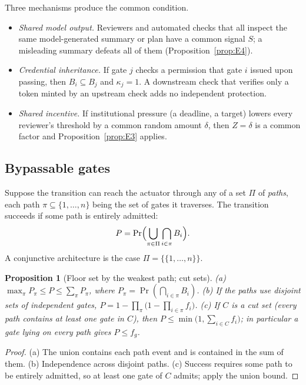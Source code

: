 \documentclass[11pt]{article}
\newtheorem{proposition}[theorem]{Proposition}
\theoremstyle{definition}
\begin{document}
Three mechanisms produce the common condition.

\begin{itemize}[leftmargin=1.6em,itemsep=0.1em]
\item \emph{Shared model output.} Reviewers and automated checks that all inspect the same model-generated summary or plan have a common signal $S$; a misleading summary defeats all of them (Proposition~\ref{prop:E4}).
\item \emph{Credential inheritance.} If gate $j$ checks a permission that gate $i$ issued upon passing, then $B_i\subseteq B_j$ and $\kappa_j=1$. A downstream check that verifies only a token minted by an upstream check adds no independent protection.
\item \emph{Shared incentive.} If institutional pressure (a deadline, a target) lowers every reviewer's threshold by a common random amount $\delta$, then $Z=\delta$ is a common factor and Proposition~\ref{prop:E3} applies.
\end{itemize}

\subsection{Bypassable gates}

Suppose the transition can reach the actuator through any of a set $\Pi$ of \emph{paths}, each path $\pi\subseteq\{1,\dots,n\}$ being the set of gates it traverses. The transition succeeds if some path is entirely admitted:
\[
P=\Pr\Bigl(\bigcup_{\pi\in\Pi}\bigcap_{i\in\pi}B_i\Bigr).
\]
A conjunctive architecture is the case $\Pi=\{\{1,\dots,n\}\}$.

\begin{proposition}[Floor set by the weakest path; cut sets]\label{prop:E5}
(a) $\max_{\pi}P_\pi\le P\le\sum_\pi P_\pi$, where $P_\pi=\Pr(\bigcap_{i\in\pi}B_i)$. (b) If the paths use disjoint sets of independent gates, $P=1-\prod_\pi\bigl(1-\prod_{i\in\pi}f_i\bigr)$. (c) If $C$ is a \emph{cut set} (every path contains at least one gate in $C$), then $P\le\min\bigl(1,\sum_{i\in C}f_i\bigr)$; in particular a gate lying on every path gives $P\le f_g$.
\end{proposition}
\begin{proof}
(a) The union contains each path event and is contained in the sum of them. (b) Independence across disjoint paths. (c) Success requires some path to be entirely admitted, so at least one gate of $C$ admits; apply the union bound.
\end{proof}
\end{document}
